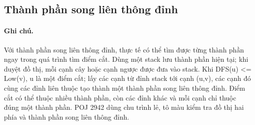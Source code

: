 \documentclass[11pt]{article}
\begin{document}
\subsection{Thành phần song liên thông đỉnh}

\paragraph{Ghi chú.} Với thành phần song liên thông đỉnh, thực tế có thể tìm được từng thành phần ngay trong quá trình tìm điểm cắt. Dùng một stack lưu thành phần hiện tại; khi duyệt đồ thị, mỗi cạnh cây hoặc cạnh ngược được đưa vào stack. Khi DFS(u) \textless{}= Low(v), u là một điểm cắt; lấy các cạnh từ đỉnh stack tới cạnh (u,v), các cạnh đó cùng các đỉnh liên thuộc tạo thành một thành phần song liên thông đỉnh. Điểm cắt có thể thuộc nhiều thành phần, còn các đỉnh khác và mỗi cạnh chỉ thuộc đúng một thành phần. POJ 2942 dùng chu trình lẻ, tô màu kiểm tra đồ thị hai phía và thành phần song liên thông đỉnh.
\end{document}
